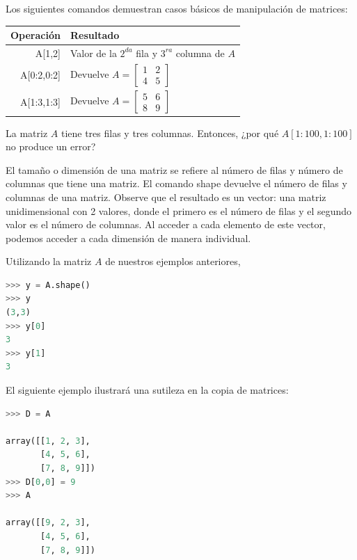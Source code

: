 Los siguientes comandos demuestran casos básicos de manipulación de matrices:
\vs

\begin{tabular}{r|l}
Operación 			& Resultado \\
\hline
{\s A[1,2]} 				&  Valor de la $2^{da}$ fila y $3^{ra}$ columna de $A$\\
{\s A[0:2,0:2]} 		&  Devuelve $A = \begin{bmatrix} 1 & 2 \\ 4 & 5\end{bmatrix} $\\
{\s A[1:3,1:3]} 		&  Devuelve $A = \begin{bmatrix} 5 & 6 \\ 8 & 9\end{bmatrix} $\\
\hline
\end{tabular}

\vs

La matriz $A$ tiene tres filas y tres columnas. Entonces, ¿por qué $A[1:100,1:100]$ no produce un error? \QA

El tamaño o dimensión de una matriz se refiere al número de filas y
número de columnas que tiene una matriz. El comando {\s shape} devuelve el número
de filas y columnas de una matriz.
Observe que el resultado es un vector: una matriz unidimensional con
2 valores, donde el primero es el número de filas y el segundo valor
es el número de columnas. Al acceder a cada elemento de este vector,
podemos acceder a cada dimensión de manera individual.

Utilizando la matriz $A$ de nuestros ejemplos anteriores,

\begin{lstlisting}[language=Python]
>>> y = A.shape()
>>> y
(3,3)
>>> y[0]
3
>>> y[1]
3
\end{lstlisting}

El siguiente ejemplo ilustrará una sutileza en la copia de matrices:

\begin{lstlisting}[language=Python]
>>> D = A

array([[1, 2, 3],
       [4, 5, 6],
       [7, 8, 9]])
>>> D[0,0] = 9
>>> A

array([[9, 2, 3],
       [4, 5, 6],
       [7, 8, 9]])
\end{lstlisting}

